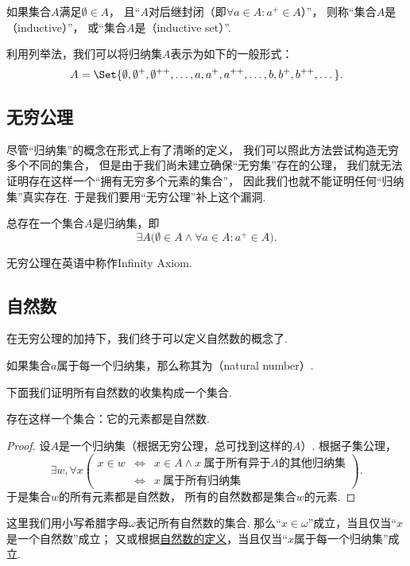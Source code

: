 \begin{definition}[归纳集]\label{definition:集合论.归纳集的定义}
如果集合\(A\)满足\(\emptyset \in A\)，%
且“\(A\)对后继封闭（即\(\forall a \in A : a^+ \in A\)）”，%
则称“集合\(A\)是（inductive）”，%
或“集合\(A\)是（inductive set）”.
\end{definition}
利用列举法，我们可以将归纳集\(A\)表示为如下的一般形式：\[
A = \Set{
 \emptyset, \emptyset^+, \emptyset^{++}, \dotsc,
 a, a^+, a^{++}, \dotsc,
 b, b^+, b^{++}, \dotsc
}.
\]

\subsection{无穷公理}
尽管“归纳集”的概念在形式上有了清晰的定义，%
我们可以照此方法尝试构造无穷多个不同的集合，%
但是由于我们尚未建立确保“无穷集”存在的公理，%
我们就无法证明存在这样一个“拥有无穷多个元素的集合”，%
因此我们也就不能证明任何“归纳集”真实存在.
于是我们要用“无穷公理”补上这个漏洞.
\begin{axiom}[无穷公理]
总存在一个集合\(A\)是归纳集，即\[
\exists A \bigl(
  \emptyset \in A
  \land
  \forall a \in A : a^+ \in A
\bigr).
\]
\end{axiom}
无穷公理在英语中称作Infinity Axiom.

\subsection{自然数}
在无穷公理的加持下，我们终于可以定义自然数的概念了.
\begin{definition}\label{definition:集合论.自然数的定义}
如果集合\(a\)属于每一个归纳集，那么称其为（natural number）.
\end{definition}

下面我们证明所有自然数的收集构成一个集合.
\begin{theorem}\label{theorem:集合论.自然数集存在定理}
存在这样一个集合：它的元素都是自然数.
\begin{proof}
设\(A\)是一个归纳集（根据无穷公理，总可找到这样的\(A\)）.
根据子集公理，%
\[
\exists w,
\forall x
\left(
\begin{array}{rcl}
x \in w
&\iff& x \in A \land x\ \text{属于所有异于\(A\)的其他归纳集} \\
&\iff& x\ \text{属于所有归纳集}
\end{array}
\right).
\]
于是集合\(w\)的所有元素都是自然数，%
所有的自然数都是集合\(w\)的元素.
\end{proof}
\end{theorem}
这里我们用小写希腊字母\(\omega\)表记所有自然数的集合.
那么“\(x \in \omega\)”成立，当且仅当“\(x\)是一个自然数”成立；
又或根据\hyperref[definition:集合论.自然数的定义]{自然数的定义}，当且仅当“\(x\)属于每一个归纳集”成立.

